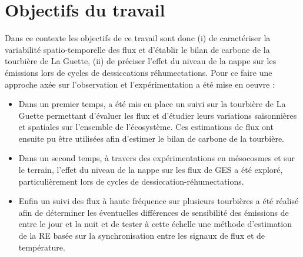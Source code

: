 \section{Objectifs du travail}
%
Dans ce contexte les objectifs de ce travail sont donc (i) de caractériser la variabilité spatio-temporelle des flux et d'établir le bilan de carbone de la tourbière de La Guette, (ii) de préciser l'effet du niveau de la nappe sur les émissions lors de cycles de dessiccations réhumectations.
Pour ce faire une approche axée sur l'observation et l'expérimentation a été mise en oeuvre : 
\begin{itemize}
\item Dans un premier temps, a été mis en place un suivi sur la tourbière de La Guette permettant d'évaluer les flux et d'étudier leurs variations saisonnières et spatiales sur l'ensemble de l'écosystème. Ces estimations de flux ont ensuite pu être utilisées afin d'estimer le bilan de carbone de la tourbière.
\item Dans un second temps, à travers des expérimentations en mésocosmes et sur le terrain, l'effet du niveau de la nappe sur les flux de GES a été exploré, particulièrement lors de cycles de dessiccation-réhumectations.
\item Enfin un suivi des flux à haute fréquence sur plusieurs tourbières a été réalisé afin de déterminer les éventuelles différences de sensibilité des émissions de \coo entre le jour et la nuit et de tester à cette échelle une méthode d'estimation de la RE basée sur la synchronisation entre les signaux de flux et de température.
\end{itemize}



